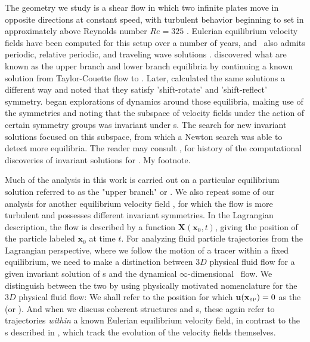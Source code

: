 The {\pC} geometry we study is a shear flow in which two infinite 
plates move in opposite directions at constant speed, with turbulent 
behavior beginning to set in approximately above Reynolds number $Re=325$ 
\citep{GHCV08}. Eulerian equilibrium velocity fields have been computed 
for this setup over a number of years, and \pCf\ also admits periodic, 
relative periodic, and traveling wave solutions \citep{GHCV08,DV04}. 
\citet{N90} discovered what are known as the upper branch and 
lower branch equilibria by continuing a known solution from 
Taylor-Couette flow to {\pC}. Later, %
\citet{W03} 
calculated the same solutions a different way and noted that they satisfy 
'shift-rotate' and 'shift-reflect' symmetry. 
\citet{GHCW07} 
began explorations of {\pC} dynamics around those equilibria, 
making use of the symmetries and noting that the subspace of velocity 
fields under the action of certain symmetry groups was invariant under 
{\NSe}s. The search for new invariant solutions focused on this 
subspace, from which a Newton search was able to detect more equilibria. 
The reader may consult \citet{GHCV08}, \citet{GHCW07} for 
history of the computational discoveries of invariant solutions for 
{\pCf}. 
 {My footnote.}

Much of the analysis in this work is carried out on a particular 
equilibrium solution referred to as the "upper branch" or {\tEQtwo}. We also 
repeat some of our analysis  for another equilibrium velocity field 
{\tEQeight}, for which the flow is more turbulent and possesses different 
invariant symmetries. In the Lagrangian description, the flow is described by a function 
$\mathbf {X}\left(\mathbf{x}_{0},t\right)$, 
giving the position of the particle labeled $\mathbf{x}_{0}$ at time $t$.  For analyzing fluid particle trajectories from the 
Lagrangian perspective, where we follow the motion of a tracer within a 
fixed equilibrium,  we need to make a distinction between $3D$ physical 
fluid flow for a given invariant solution of {\NSe}s and the dynamical 
$\infty$-dimensional \statesp\ flow. We distinguish between the two by 
using physically motivated nomenclature for the $3D$ physical fluid flow: 
We shall refer to the position for which $\bu(\xSP{})=0$ as the {\em 
\stagp} \xSP{} (or \tSP{}). And when we discuss coherent 
structures and {\hc}s, these again refer to trajectories \emph{within} 
a known Eulerian equilibrium velocity field, in contrast to the {\hc}s 
described in \citet{GHCV08}, which track the evolution of the 
velocity fields themselves. 

